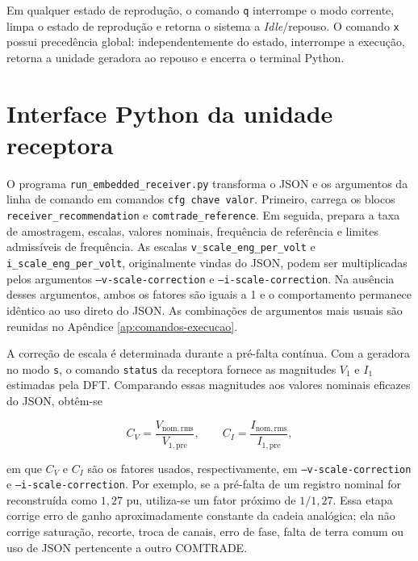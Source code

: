 Em qualquer estado de reprodução, o comando \texttt{q} interrompe o modo corrente, limpa o estado de reprodução e retorna o sistema a \textit{Idle}/repouso. O comando \texttt{x} possui precedência global: independentemente do estado, interrompe a execução, retorna a unidade geradora ao repouso e encerra o terminal Python.

\section{Interface Python da unidade receptora}

O programa \texttt{run\_embedded\_receiver.py} transforma o JSON e os argumentos da linha de comando em comandos \texttt{cfg chave valor}. Primeiro, carrega os blocos \texttt{receiver\_recommendation} e \texttt{comtrade\_reference}. Em seguida, prepara a taxa de amostragem, escalas, valores nominais, frequência de referência e limites admissíveis de frequência. As escalas \texttt{v\_scale\_eng\_per\_volt} e \texttt{i\_scale\_eng\_per\_volt}, originalmente vindas do JSON, podem ser multiplicadas pelos argumentos \texttt{--v-scale-correction} e \texttt{--i-scale-correction}. Na ausência desses argumentos, ambos os fatores são iguais a 1 e o comportamento permanece idêntico ao uso direto do JSON. As combinações de argumentos mais usuais são reunidas no Apêndice \ref{ap:comandos-execucao}.

A correção de escala é determinada durante a pré-falta contínua. Com a geradora no modo \texttt{s}, o comando \texttt{status} da receptora fornece as magnitudes $V_1$ e $I_1$ estimadas pela DFT. Comparando essas magnitudes aos valores nominais eficazes do JSON, obtêm-se

\begin{equation}
  C_V=\frac{V_{\mathrm{nom,rms}}}{V_{1,\mathrm{pre}}}, \qquad
  C_I=\frac{I_{\mathrm{nom,rms}}}{I_{1,\mathrm{pre}}},
  \label{eq:correcao-escala-receptor}
\end{equation}

em que $C_V$ e $C_I$ são os fatores usados, respectivamente, em \texttt{--v-scale-correction} e \texttt{--i-scale-correction}. Por exemplo, se a pré-falta de um registro nominal for reconstruída como $1{,}27$ pu, utiliza-se um fator próximo de $1/1{,}27$. Essa etapa corrige erro de ganho aproximadamente constante da cadeia analógica; ela não corrige saturação, recorte, troca de canais, erro de fase, falta de terra comum ou uso de JSON pertencente a outro COMTRADE.

